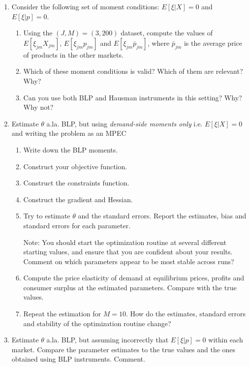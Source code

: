 \documentclass[12pt ]{article}
\begin{document}
\begin{enumerate}[1.]
\item Consider the following set of moment conditions: $E[\xi|X]=0$ and
  $E[\xi|p]=0$.
  \begin{enumerate}
  \item Using the $(J,M)=(3,200)$ dataset, compute the values of
    $E[\xi_{jm}X_{jm}]$, $E[\xi_{jm}p_{jm}]$ and
    $E[\xi_{jm}\bar{p}_{jm}]$, where $\bar{p}_{jm}$ is the average
    price of products in the other markets.
  \item Which of these moment conditions is valid? Which of them are relevant?
    Why?
  \item Can you use both BLP and Hausman instruments in this
    setting? Why? Why not?
  \end{enumerate}
\item Estimate $\theta$ a.la. BLP, but using \emph{demand-side
    moments only} i.e. $E[\xi|X]=0$ and writing the problem as an MPEC
  \begin{enumerate}
  \item Write down the BLP moments.
  \item Construct your objective function.
  \item Construct the constraints function.
  \item Construct the gradient and Hessian.
  \item Try to estimate $\theta$ and the standard errors. Report the
    estimates, bias and standard errors for each parameter.

    Note: You should start the optimization routine at several
    different starting values, and ensure that you are confident about
    your results. Comment on which parameters appear to be most stable across
    runs?
      
  \item Compute the price elasticity of demand at equilibrium prices,
    profits and consumer surplus at the estimated parameters. Compare
    with the true values.
  \item Repeat the estimation for $M=10$. How do the estimates,
    standard errors and stability of the optimization routine change?
  \end{enumerate}
\item Estimate $\theta$ a.la. BLP, but assuming incorrectly that $E[\xi|p]=0$
  within each market. Compare the parameter estimates to the true
  values and the ones obtained using BLP instruments. Comment.
\end{enumerate}
\end{document}
